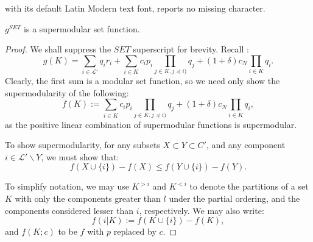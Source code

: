 \documentclass[10pt,a4paper]{amsart}
\begin{document}
with its default Latin Modern text font, reports no missing character.
\begin{lemma}
\label{lemma:supermodular}
    $g^{SET}$ is a supermodular set function.
\end{lemma}

\begin{proof}
We shall suppress the $SET$ superscript for brevity. Recall :
$$g(K) = \sum_{i\in\mathcal{L}'}q_ir_i + \sum_{i\in K}c_ip_i\prod_{j\in K,j\preceq i)}q_j + (1+\delta)c_N\prod_{i\in K}q_i.$$
Clearly, the first sum is a modular set function, so we need only show the supermodularity of the following:
$$f(K) := \sum_{i\in K}c_ip_i\prod_{j\in K,j\preceq i)}q_j + (1+\delta)c_N\prod_{i\in K}q_i,$$
as the positive linear combination of supermodular functions is supermodular.

To show supermodularity, for any subsets $X\subset Y \subset C'$, and any component $i\in \mathcal{L}'\backslash Y$, we must show that:
$$f(X\cup\{i\}) - f(X) \leq f(Y\cup\{i\}) - f(Y).$$

To simplify notation, we may use $K^{>i}$ and $K^{<i}$ to denote the partitions of a set $K$ with only the components greater than $l$ under the partial ordering, and the components considered lesser than $i$, respectively. We may also write:
$$f(i|K) := f(K\cup\{i\}) - f(K),$$
and $f(K;c)$ to be $f$ with $p$ replaced by $c$.


\end{proof}
\end{document}
